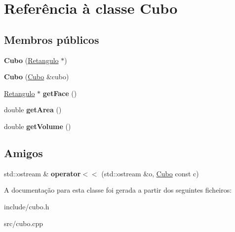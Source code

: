 \hypertarget{classCubo}{\section{Referência à classe Cubo}
\label{classCubo}
}
\subsection*{Membros públicos}
\begin{DoxyCompactItemize}
\item 
\hypertarget{classCubo_a65aee0fdc6828bb08cbd087137b6acca}{{\bfseries Cubo} (\hyperlink{classRetangulo}{Retangulo} $\ast$)}\label{classCubo_a65aee0fdc6828bb08cbd087137b6acca}

\item 
\hypertarget{classCubo_a3d1a0e3dc4a1350c258e29a87f6df52a}{{\bfseries Cubo} (\hyperlink{classCubo}{Cubo} \&cubo)}\label{classCubo_a3d1a0e3dc4a1350c258e29a87f6df52a}

\item 
\hypertarget{classCubo_aca8d1d13e817a8caf351e1c8ef3c3669}{\hyperlink{classRetangulo}{Retangulo} $\ast$ {\bfseries get\-Face} ()}\label{classCubo_aca8d1d13e817a8caf351e1c8ef3c3669}

\item 
\hypertarget{classCubo_aee3bf75f34b639b359fcf0e5a9a905e8}{double {\bfseries get\-Area} ()}\label{classCubo_aee3bf75f34b639b359fcf0e5a9a905e8}

\item 
\hypertarget{classCubo_a9401bf7e1ddd0613247675f8067f040d}{double {\bfseries get\-Volume} ()}\label{classCubo_a9401bf7e1ddd0613247675f8067f040d}

\end{DoxyCompactItemize}
\subsection*{Amigos}
\begin{DoxyCompactItemize}
\item 
\hypertarget{classCubo_a12f3cc8f6bf3f8245fbe6fce13a56631}{std\-::ostream \& {\bfseries operator$<$$<$} (std\-::ostream \&o, \hyperlink{classCubo}{Cubo} const c)}\label{classCubo_a12f3cc8f6bf3f8245fbe6fce13a56631}

\end{DoxyCompactItemize}


A documentação para esta classe foi gerada a partir dos seguintes ficheiros\-:\begin{DoxyCompactItemize}
\item 
include/cubo.\-h\item 
src/cubo.\-cpp\end{DoxyCompactItemize}
